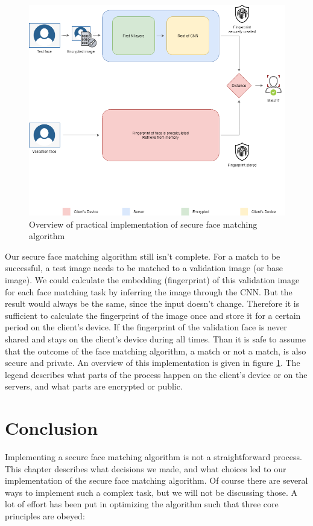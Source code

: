 \begin{figure}[H]
  \includegraphics[scale=0.5]{fig/implementation_overview.png}
  \centering
  \caption{Overview of practical implementation of secure face matching algorithm}
  \label{fig:implementation_overview}
\end{figure}

Our secure face matching algorithm still isn't complete. For a match to be successful, a test image needs to be matched to a validation image (or base image). We could calculate the embedding (fingerprint) of this validation image for each face matching task by inferring the image through the CNN. But the result would always be the same, since the input doesn't change. Therefore it is sufficient to calculate the fingerprint of the image once and store it for a certain period on the client's device. If the fingerprint of the validation face is never shared and stays on the client's device during all times. Than it is safe to assume that the outcome of the face matching algorithm, a match or not a match, is also secure and private. An overview of this implementation is given in figure \ref{fig:implementation_overview}. The legend describes what parts of the process happen on the client's device or on the servers, and what parts are encrypted or public.

\section{Conclusion}
Implementing a secure face matching algorithm is not a straightforward process. This chapter describes what decisions we made, and what choices led to our implementation of the secure face matching algorithm. Of course there are several ways to implement such a complex task, but we will not be discussing those. A lot of effort has been put in optimizing the algorithm such that three core principles are obeyed:

